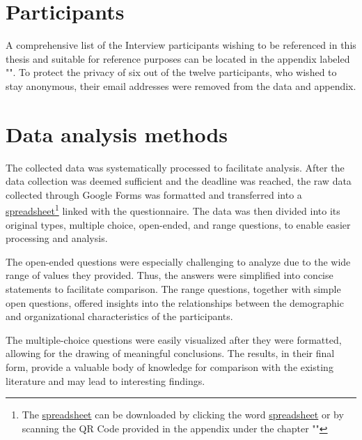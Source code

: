 \section{Participants}\label{sec:Participants}
A comprehensive list of the Interview participants wishing to be referenced in this thesis and suitable for reference purposes can be located in the appendix labeled "". To protect the privacy of six out of the twelve participants, who wished to stay anonymous, their email addresses were removed from the data and appendix.

\section{Data analysis methods}\label{sec:Dataanalysismethods}
The collected data was systematically processed to facilitate analysis. After the data collection was deemed sufficient and the deadline was reached, the raw data collected through Google Forms was formatted and transferred into a \href{https://github.com/mai-space/mai-joel_maximilian-bachelor_thesis/raw/main/assets/data/data-formated-for-analysis.xlsx}{spreadsheet}\footnote{The \href{https://github.com/mai-space/mai-joel_maximilian-bachelor_thesis/raw/main/assets/data/data-formated-for-analysis.xlsx}{spreadsheet} can be downloaded by clicking the word \href{https://github.com/mai-space/mai-joel_maximilian-bachelor_thesis/raw/main/assets/data/data-formated-for-analysis.xlsx}{spreadsheet} or by scanning the QR Code provided in the appendix under the chapter ""} linked with the questionnaire. The data was then divided into its original types, multiple choice, open-ended, and range questions, to enable easier processing and analysis.

The open-ended questions were especially challenging to analyze due to the wide range of values they provided. Thus, the answers were simplified into concise statements to facilitate comparison. The range questions, together with simple open questions, offered insights into the relationships between the demographic and organizational characteristics of the participants.

The multiple-choice questions were easily visualized after they were formatted, allowing for the drawing of meaningful conclusions. The results, in their final form, provide a valuable body of knowledge for comparison with the existing literature and may lead to interesting findings.